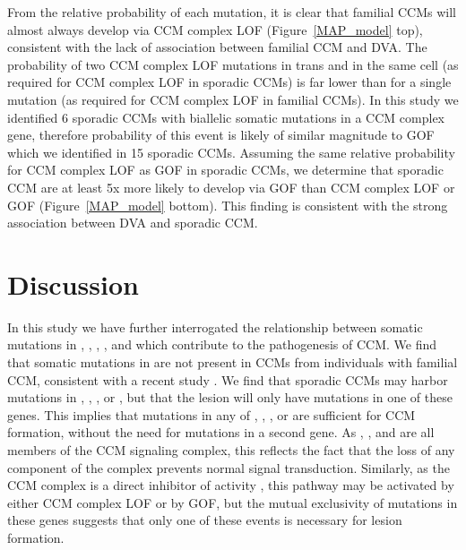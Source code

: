 From the relative probability of each mutation, it is clear that familial CCMs will almost always develop via CCM complex LOF (Figure~\ref{MAP_model} top), consistent with the lack of association between familial CCM and DVA. The probability of two CCM complex LOF mutations in trans and in the same cell (as required for CCM complex LOF in sporadic CCMs) is far lower than for a single mutation (as required for CCM complex LOF in familial CCMs). In this study we identified 6 sporadic CCMs with biallelic somatic mutations in a CCM complex gene, therefore probability of this event is likely of similar magnitude to  GOF which we identified in 15 sporadic CCMs. Assuming the same relative probability for CCM complex LOF as  GOF in sporadic CCMs, we determine that sporadic CCM are at least 5x more likely to develop via  GOF than CCM complex LOF or  GOF (Figure~\ref{MAP_model} bottom). This finding is consistent with the strong association between DVA and sporadic CCM.



\section{Discussion}

In this study we have further interrogated the relationship between somatic mutations in , , , , and  which contribute to the pathogenesis of CCM. We find that somatic mutations in  are not present in CCMs from individuals with familial CCM, consistent with a recent study \citep{weng2021}.  We find that sporadic CCMs may harbor mutations in , , , or , but that the lesion will only have mutations in one of these genes. This implies that mutations in any of , , , or  are sufficient for CCM formation, without the need for mutations in a second gene. As , , and  are all members of the CCM signaling complex, this reflects the fact that the loss of any component of the complex prevents normal signal transduction. Similarly, as the CCM complex is a direct inhibitor of  activity \citep{zhou2015}, this pathway may be activated by either CCM complex LOF or by  GOF, but the mutual exclusivity of mutations in these genes suggests that only one of these events is necessary for lesion formation. 

